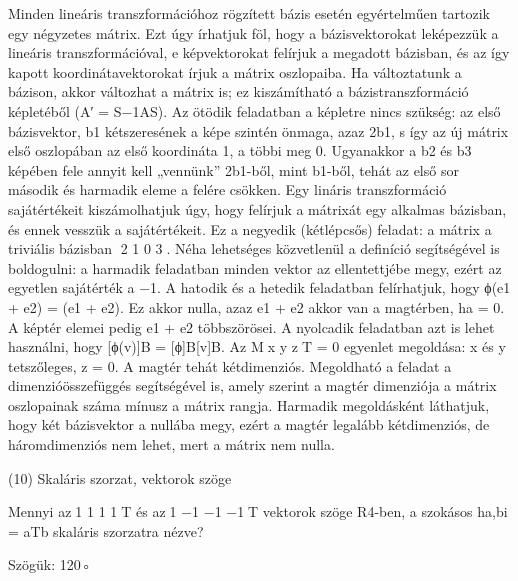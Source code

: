 \begin{frame}
  \begin{tcolorbox}[title={9/4. -R-}]
    Minden lineáris transzformációhoz rögzített bázis esetén egyértelműen tartozik egy négyzetes mátrix. Ezt úgy írhatjuk föl, hogy a bázisvektorokat leképezzük a lineáris transzformációval, e képvektorokat felírjuk a megadott bázisban, és az így kapott koordinátavektorokat írjuk a mátrix oszlopaiba. Ha változtatunk a bázison, akkor változhat a mátrix is; ez kiszámítható a bázistranszformáció képletéből (A′ = S−1AS). Az ötödik feladatban a képletre nincs szükség: az első bázisvektor, b1 kétszeresének a képe szintén önmaga, azaz 2b1, s így az új mátrix első oszlopában az első koordináta 1, a többi meg 0. Ugyanakkor a b2 és b3 képében fele annyit kell „vennünk” 2b1-ből, mint b1-ből, tehát az első sor második és harmadik eleme a felére csökken. Egy lináris transzformáció sajátértékeit kiszámolhatjuk úgy, hogy felírjuk a mátrixát egy alkalmas bázisban, és ennek vesszük a sajátértékeit. Ez a negyedik (kétlépcsős) feladat: a mátrix a triviális bázisban 2 1 0 3. Néha lehetséges közvetlenül a deﬁníció segítségével is boldogulni: a harmadik feladatban minden vektor az ellentettjébe megy, ezért az egyetlen sajátérték a −1. A hatodik és a hetedik feladatban felírhatjuk, hogy ϕ({\lambda}e1 + {\mu}e2) = {\mu}(e1 + e2). Ez akkor nulla, azaz {\lambda}e1 + {\mu}e2 akkor van a magtérben, ha {\mu} = 0. A képtér elemei pedig e1 + e2 többszörösei. A nyolcadik feladatban azt is lehet használni, hogy [ϕ(v)]B = [ϕ]B[v]B. Az Mx y zT = 0 egyenlet megoldása: x és y tetszőleges, z = 0. A magtér tehát kétdimenziós. Megoldható a feladat a dimenzióösszefüggés segítségével is, amely szerint a magtér dimenziója a mátrix oszlopainak száma mínusz a mátrix rangja. Harmadik megoldásként láthatjuk, hogy két bázisvektor a nullába megy, ezért a magtér legalább kétdimenziós, de háromdimenziós nem lehet, mert a mátrix nem nulla.

  \end{tcolorbox}
\end{frame}


\begin{frame}[plain]
\begin{tcolorbox}[center, colback={myyellow}, coltext={black}, colframe={myyellow}]
    {\RHuge  (10) Skaláris szorzat, vektorok szöge }
    \mmedskip
\end{tcolorbox}
\end{frame}

\begin{frame}
  \begin{tcolorbox}[title={10/1. -N-}]
    Mennyi az1 1 1 1T és az1 −1 −1 −1T vektorok szöge R4-ben, a szokásos ha,bi = aTb skaláris szorzatra nézve?

  \tcblower

    \mmedskip 
    
    Szögük: 120◦

  \end{tcolorbox}
\end{frame}


